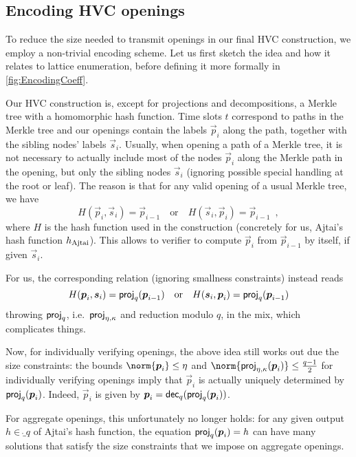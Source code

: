 \subsection{Encoding HVC openings}\label{sect:efficientencoding}




To reduce the size needed to transmit openings in our final HVC construction, we employ a non-trivial encoding scheme.
Let us first sketch the idea and how it relates to lattice enumeration, before defining it more formally in \autoref{fig:EncodingCoeff}.

Our HVC construction is, except for projections and decompositions, a Merkle tree with a homomorphic hash function.
Time slots $t$ correspond to paths in the Merkle tree and our openings contain the labels $\vec{p}_i$ along the path, together with the sibling nodes' labels $\vec{s}_i$.
Usually, when opening a path of a Merkle tree, it is not necessary to actually include most of the nodes $\vec{p}_i$ along the Merkle path in the opening, but only the sibling nodes $\vec{s}_i$ (ignoring possible special handling at the root or leaf).
The reason is that for any valid opening of a usual Merkle tree, we have 
\[
 H(\vec{p}_i,\vec{s}_i) = \vec{p}_{i-1} \quad\text{or}\quad H(\vec{s}_i,\vec{p}_i) = \vec{p}_{i-1}\enspace, 
\]
where $H$ is the hash function used in the construction (concretely for us, Ajtai's hash function $h_\mathrm{Ajtai}$).
This allows to verifier to compute $\vec{p}_i$ from $\vec{p}_{i-1}$ by itself, if given $\vec{s}_i$.

For us, the corresponding relation (ignoring smallness constraints) instead reads
\[
 H(\boldsymbol{p}_i,\boldsymbol{s}_i) =  \mathsf{proj}_{q}(\boldsymbol{p}_{i-1})  \quad\text{or}\quad H(\boldsymbol{s}_i,\boldsymbol{p}_i) = \mathsf{proj}_{q}(\boldsymbol{p}_{i-1})
\]
throwing $\mathsf{proj}_{q}$, i.e.\ $\mathsf{proj}_{\eta,\kappa}$ and reduction modulo $q$, in the mix, which complicates things.

Now, for individually verifying openings, the above idea still works out due the size constraints:
the bounds $\norm{\vec{p}_i} \leq \eta$ and $\norm{\projring(\vec{p}_i)}\leq \tfrac{q-1}{2}$ for individually verifying openings imply that $\vec{p}_i$ is actually uniquely determined by $\mathsf{proj}_{q}(\boldsymbol{p}_i)$.
Indeed, $\vec{p}_i$ is given by $\boldsymbol{p}_i = \mathsf{dec}_{q}(\mathsf{proj}_{q}(\boldsymbol{p}_i))$.

For aggregate openings, this unfortunately no longer holds:
for any given output $h\in\ring_q$ of Ajtai's hash function, the equation $\mathsf{proj}_{q}(\boldsymbol{p}_i) = h$ can have many solutions
that satisfy the size constraints that we impose on aggregate openings.

